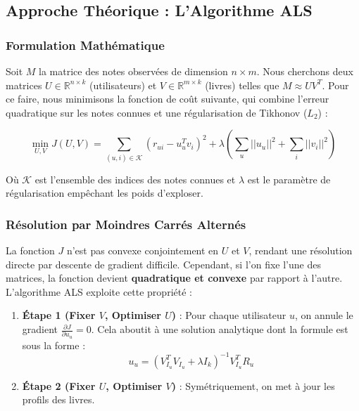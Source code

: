 \documentclass[11pt,a4paper]{article}
\begin{document}
\subsection{Approche Théorique : L'Algorithme ALS}

\subsubsection{Formulation Mathématique}
Soit $M$ la matrice des notes observées de dimension $n \times m$. Nous cherchons deux matrices $U \in \mathbb{R}^{n \times k}$ (utilisateurs) et $V \in \mathbb{R}^{m \times k}$ (livres) telles que $M \approx U V^T$.
Pour ce faire, nous minimisons la fonction de coût suivante, qui combine l'erreur quadratique sur les notes connues et une régularisation de Tikhonov ($L_2$) :

\begin{equation}
    \min_{U, V} J(U, V) = \sum_{(u,i) \in \mathcal{K}} (r_{ui} - u_u^T v_i)^2 + \lambda \left( \sum_u ||u_u||^2 + \sum_i ||v_i||^2 \right)
\end{equation}

Où $\mathcal{K}$ est l'ensemble des indices des notes connues et $\lambda$ est le paramètre de régularisation empêchant les poids d'exploser.\citep{takacs2012alternating}

\subsubsection{Résolution par Moindres Carrés Alternés}
La fonction $J$ n'est pas convexe conjointement en $U$ et $V$, rendant une résolution directe par descente de gradient difficile. Cependant, si l'on fixe l'une des matrices, la fonction devient \textbf{quadratique et convexe} par rapport à l'autre. L'algorithme ALS exploite cette propriété :

\begin{enumerate}
    \item \textbf{Étape 1 (Fixer $V$, Optimiser $U$)} : Pour chaque utilisateur $u$, on annule le gradient $\frac{\partial J}{\partial u_u} = 0$. Cela aboutit à une solution analytique dont la formule est sous la forme :
    \begin{equation}
        u_u = (V_{I_u}^T V_{I_u} + \lambda I_k)^{-1} V_{I_u}^T R_u
    \end{equation}
   
    \item \textbf{Étape 2 (Fixer $U$, Optimiser $V$)} : Symétriquement, on met à jour les profils des livres.
\end{enumerate}
\end{document}
